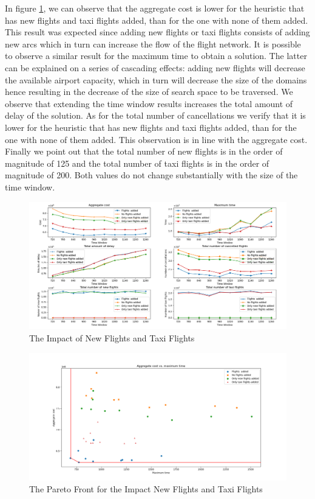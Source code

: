 In  figure \ref{fig:flightNoFlight}, we can observe that the aggregate cost is lower for the heuristic that has new flights and taxi flights added, than for the one with none of them added. This result was expected since adding new flights or taxi flights consists of adding new arcs which in turn can increase the flow of the flight network. It is possible to observe a similar result for the maximum time to obtain a solution. The latter can be explained on a series of cascading effects: adding new flights will decrease the available airport capacity, which in turn will decrease the size of the domains hence resulting in the decrease of the size of search space to be traversed. We  observe that extending the time window results increases the total amount of delay of the solution. As for the total number of cancellations we verify that it is lower for the heuristic that has new flights and taxi flights added, than for the one with none of them added. This observation is in line with the aggregate cost. Finally we point out that the total number of new flights is in the order of magnitude of 125 and the total number of taxi flights is in the order of magnitude of 200. Both values do not change substantially with the size of the time window.

	\begin{figure}[h!]
		\centering
		\includegraphics[width=\textwidth]{figures/flightNoFlight2x3.png}
		\caption[]{The Impact of New Flights and Taxi Flights}
		\label{fig:flightNoFlight}
	\end{figure}

	\begin{figure}[h!]
		\centering
		\includegraphics[width=\textwidth]{figures/costTimeFlights.png}
		\caption[]{The Pareto Front for the Impact New Flights and Taxi Flights}
		\label{fig:costTimeFlights}
	\end{figure}



